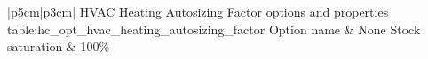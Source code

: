 \begin{customLongTable}{ |p{5cm}|p{3cm}| }
{HVAC Heating Autosizing Factor options and properties} {table:hc_opt_hvac_heating_autosizing_factor}
{Option name & None}
\endhead
\hline
Stock saturation & 100\% \\ \hline
\end{customLongTable}
